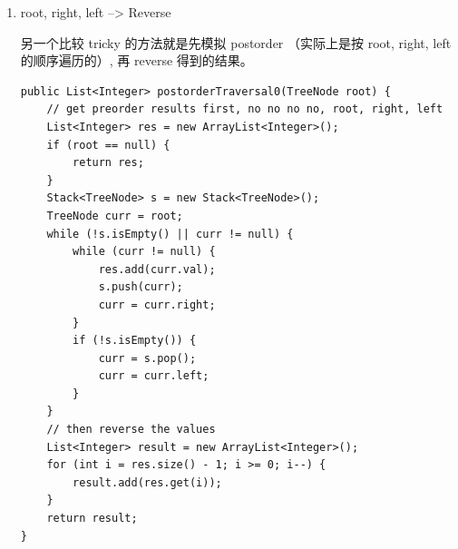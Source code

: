 \documentclass[12pt]{book}
\begin{document}
\begin{enumerate}
\begin{lstlisting}
        dummy.left = root;
        cur = &dummy;
        while (cur != nullptr) {
            if (cur->left == nullptr) {
                prev = cur;                  /* 必须要有 */
                cur = cur->right;
            } else {
                TreeNode *node = cur->left;
                while (node->right != nullptr && node->right != cur)
                    node = node->right;
                if (node->right == nullptr) { /* 还没线索化,则建立线索 */
                    node->right = cur;
                    prev = cur;              /* 必须要有 */
                    cur = cur->left;
                } else { /* 已经线索化,则访问节点,并删除线索 */
                    visit_reverse(cur->left, prev, visit);
                    prev->right = nullptr;
                    prev = cur;              /* 必须要有 */
                    cur = cur->right;
                }
            }
        }
        return result;
    }
private:
    // 逆转路径
    static void reverse(TreeNode *from, TreeNode *to) {
        TreeNode *x = from, *y = from->right, *z;
        if (from == to) return;
        while (x != to) {
            z = y->right;
            y->right = x;
            x = y;
            y = z;
        }
    }
    // 访问逆转后的路径上的所有结点
    static void visit_reverse(TreeNode* from, TreeNode *to,
                              std::function< void(const TreeNode*) > &visit) {
        TreeNode *p = to;
        reverse(from, to);
        while (true) {
            visit(p);
            if (p == from)
                break;
            p = p->right;
        }
        reverse(to, from);
    }
};
\end{lstlisting}

一段代码写成这样，实在是太恐怖了。。。面试的时候怎么出得来？还是把原理
弄懂尽量不要写这种方法好了。。。

\item root, right, left --> Reverse
\label{sec-4-2-3-3}

另一个比较 tricky 的方法就是先模拟 postorder （实际上是按 root, right,
left 的顺序遍历的）, 再 reverse 得到的结果。

\lstset{language=java,label= ,caption= ,numbers=none}
\begin{lstlisting}
public List<Integer> postorderTraversal0(TreeNode root) {
    // get preorder results first, no no no no, root, right, left
    List<Integer> res = new ArrayList<Integer>();
    if (root == null) {
        return res;
    }
    Stack<TreeNode> s = new Stack<TreeNode>();
    TreeNode curr = root;
    while (!s.isEmpty() || curr != null) {
        while (curr != null) {
            res.add(curr.val);
            s.push(curr);
            curr = curr.right;
        }
        if (!s.isEmpty()) {
            curr = s.pop();
            curr = curr.left;
        } 
    }
    // then reverse the values
    List<Integer> result = new ArrayList<Integer>();
    for (int i = res.size() - 1; i >= 0; i--) {
        result.add(res.get(i));
    }
    return result;
}
\end{lstlisting}
\end{enumerate}
\end{document}
